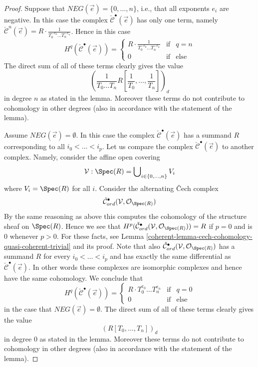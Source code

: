 \begin{proof}
\medskip\noindent
Suppose that $NEG(\vec{e}) = \{0, \ldots, n\}$, i.e., that all
exponents $e_i$ are negative.
In this case the complex $\check{\mathcal{C}}^\bullet(\vec{e})$ has
only one term, namely $\check{\mathcal{C}}^n(\vec{e}) =
R \cdot \frac{1}{T_0^{-e_0} \ldots T_n^{-e_n}}$. Hence in this
case
$$
H^q(\check{\mathcal{C}}^\bullet(\vec{e})) =
\left\{
\begin{matrix}
R \cdot \frac{1}{T_0^{-e_0} \ldots T_n^{-e_n}} & \text{if} & q = n \\
0 & \text{if} & \text{else}
\end{matrix}
\right.
$$
The direct sum of all of these terms clearly gives the value
$$
\left(\frac{1}{T_0 \ldots T_n} R[\frac{1}{T_0}, \ldots, \frac{1}{T_n}]\right)_d
$$
in degree $n$ as stated in the lemma. Moreover these terms do not contribute
to cohomology in other degrees (also in accordance with the statement of the
lemma).

\medskip\noindent
Assume $NEG(\vec{e}) = \emptyset$. In this case the complex
$\check{\mathcal{C}}^\bullet(\vec{e})$ has a summand $R$ corresponding
to all $i_0 < \ldots < i_p$.
Let us compare the complex $\check{\mathcal{C}}^\bullet(\vec{e})$
to another complex. Namely, consider the affine open covering
$$
\mathcal{V} : \Spec(R) = \bigcup\nolimits_{i \in \{0, \ldots, n\}} V_i
$$
where $V_i = \Spec(R)$ for all $i$. Consider the alternating
{\v C}ech complex
$$
\check{\mathcal{C}}_{ord}^\bullet(\mathcal{V}, \mathcal{O}_{\Spec(R)})
$$
By the same reasoning as above this computes the cohomology of the
structure sheaf on $\Spec(R)$. Hence we see that
$H^p(
\check{\mathcal{C}}_{ord}^\bullet(\mathcal{V}, \mathcal{O}_{\Spec(R)})
) = R$ if $p = 0$ and is $0$ whenever $p > 0$.
For these facts, see
Lemma \ref{coherent-lemma-cech-cohomology-quasi-coherent-trivial} and its proof.
Note that also
$\check{\mathcal{C}}_{ord}^\bullet(\mathcal{V}, \mathcal{O}_{\Spec(R)})$
has a summand $R$ for every $i_0 < \ldots < i_p$ and has exactly the same
differential as $\check{\mathcal{C}}^\bullet(\vec{e})$. In other words
these complexes are isomorphic complexes and hence have the same cohomology.
We conclude that
$$
H^q(\check{\mathcal{C}}^\bullet(\vec{e})) =
\left\{
\begin{matrix}
R \cdot T_0^{e_0} \ldots T_n^{e_n} & \text{if} & q = 0 \\
0 & \text{if} & \text{else}
\end{matrix}
\right.
$$
in the case that $NEG(\vec{e}) = \emptyset$.
The direct sum of all of these terms clearly gives the value
$$
(R[T_0, \ldots, T_n])_d
$$
in degree $0$ as stated in the lemma. Moreover these terms do not contribute
to cohomology in other degrees (also in accordance with the statement of the
lemma).


\end{proof}
